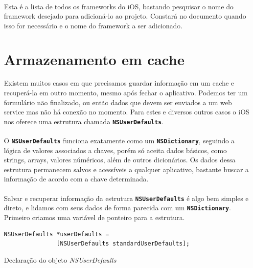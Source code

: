 \documentclass[a4paper,12pt,brazil,doubleside]{book}
\begin{document}
\begin{singlespace}
\paragraph{}Esta é a lista de todos os frameworks do iOS, bastando pesquisar o nome do framework desejado para adicioná-lo ao projeto. Constará no documento quando isso for necessário e o nome do framework a ser adicionado.

\bigskip
\bigskip


\section{Armazenamento em cache}

\paragraph{}Existem muitos casos em que precisamos guardar informação em um cache e recuperá-la em outro momento, mesmo após fechar o aplicativo. Podemos ter um formulário não finalizado, ou então dados que devem ser enviados a um web service mas não há conexão no momento. Para estes e diversos outros casos o iOS nos oferece uma estrutura chamada \texttt{\textbf{NSUserDefaults}}.
\paragraph{}O \texttt{\textbf{NSUserDefaults}} funciona exatamente como um \texttt{\textbf{NSDictionary}}, seguindo a lógica de valores associados a chaves, porém só aceita dados básicos, como strings, arrays, valores núméricos, além de outros dicionários. Os dados dessa estrutura permanecem salvos e acessíveis a qualquer aplicativo, bastante buscar a informação de acordo com a chave determinada.
\paragraph{}Salvar e recuperar informação da estrutura \texttt{\textbf{NSUserDefaults}} é algo bem simples e direto, e lidamos com seus dados de forma parecida com um \texttt{\textbf{NSDictionary}}. Primeiro criamos uma variável de ponteiro para a estrutura.

\begin{listing}[H]
\begin{verbatim}
NSUserDefaults *userDefaults =
               [NSUserDefaults standardUserDefaults];
\end{verbatim}
\caption{Declaração do objeto \emph{NSUserDefaults}}
\end{listing}


\end{singlespace}
\end{document}
